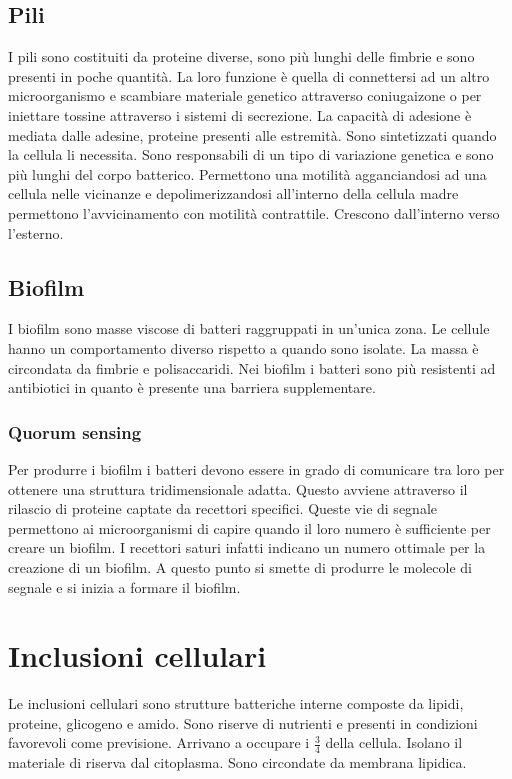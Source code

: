 	\subsection{Pili}
	I pili sono costituiti da proteine diverse, sono pi\`u lunghi delle fimbrie e sono presenti in poche quantit\`a.
	La loro funzione \`e quella di connettersi ad un altro microorganismo e scambiare materiale genetico attraverso coniugaizone o per iniettare tossine attraverso i sistemi di secrezione.
	La capacit\`a di adesione \`e mediata dalle adesine, proteine presenti alle estremit\`a.
	Sono sintetizzati quando la cellula li necessita.
	Sono responsabili di un tipo di variazione genetica e sono pi\`u lunghi del corpo batterico.
	Permettono una motilit\`a agganciandosi ad una cellula nelle vicinanze e depolimerizzandosi all'interno della cellula madre permettono l'avvicinamento con motilit\`a contrattile.
	Crescono dall'interno verso l'esterno.

	\subsection{Biofilm}
	I biofilm sono masse viscose di batteri raggruppati in un'unica zona.
	Le cellule hanno un comportamento diverso rispetto a quando sono isolate.
	La massa \`e circondata da fimbrie e polisaccaridi.
	Nei biofilm i batteri sono pi\`u resistenti ad antibiotici in quanto \`e presente una barriera supplementare.

		\subsubsection{Quorum sensing}
		Per produrre i biofilm i batteri devono essere in grado di comunicare tra loro per ottenere una struttura tridimensionale adatta.
		Questo avviene attraverso il rilascio di proteine captate da recettori specifici.
		Queste vie di segnale permettono ai microorganismi di capire quando il loro numero \`e sufficiente per creare un biofilm.
		I recettori saturi infatti indicano un numero ottimale per la creazione di un biofilm.
		A questo punto si smette di produrre le molecole di segnale e si inizia a formare il biofilm.

\section{Inclusioni cellulari}
Le inclusioni cellulari sono strutture batteriche interne composte da lipidi, proteine, glicogeno e amido.
Sono riserve di nutrienti e presenti in condizioni favorevoli come previsione.
Arrivano a occupare i $\frac{3}{4}$ della cellula.
Isolano il materiale di riserva dal citoplasma.
Sono circondate da membrana lipidica.
	
